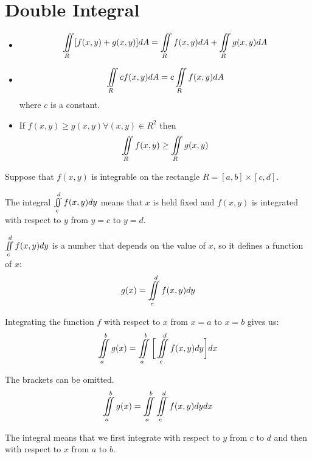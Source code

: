 \chapter{Double Integral}

  \begin{itemize}
    \item 
      \begin{align*}
        \iint \limits_R [f(x, y)+ g(x, y)]dA = \iint \limits_R f(x, y)dA + \iint \limits_R g(x, y)dA
      \end{align*}
    \item 
      \begin{align*}
        \iint \limits_R cf(x, y)dA = c \iint \limits_R f(x, y)dA
      \end{align*}
      where $c$ is a constant.
    \item If $f(x, y) \geq g(x, y) \forall (x, y) \in R^{2}$ then
      \begin{align*}
        \iint \limits_R f(x, y) \geq \iint \limits_R g(x, y)
      \end{align*}
  \end{itemize}


  \par Suppose that $f(x, y)$ is integrable on the rectangle
    $R = [a, b] \times [c, d]$.
  \par The integral $\iint \limits_{c}^{d} f(x, y)dy$ means that $x$ is held fixed
    and $f(x, y)$ is integrated with respect to $y$ from $y = c$ to $y = d$.
  \par $\iint \limits_{c}^{d} f(x, y)dy$ is a number that depends on the value of $x$,
    so it defines a function of $x$:
    \begin{align*}
      g(x) = \iint \limits_{c}^{d} f(x, y)dy
    \end{align*}
  \par Integrating the function $f$ with respect to $x$ from $x = a$ to $x = b$
    gives us:
    \begin{align*}
      \iint \limits_{a}^{b} g(x) = \iint \limits_{a}^{b} \bigg[\iint \limits_{c}^{d} f(x, y)dy\bigg] dx
    \end{align*}
  \par The brackets can be omitted.
    \begin{align*}
      \iint \limits_{a}^{b} g(x) = \iint \limits_{a}^{b} \iint \limits_{c}^{d} f(x, y)dydx
    \end{align*}
  \par The integral means that we first integrate with respect to $y$ from $c$
    to $d$ and then with respect to $x$ from $a$ to $b$.


